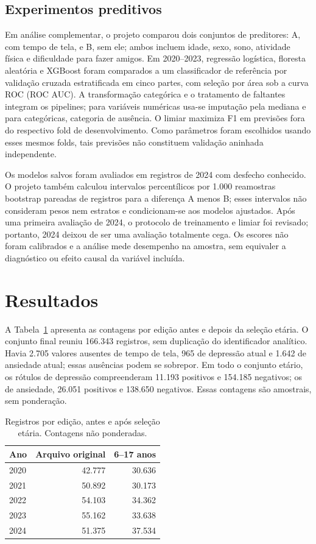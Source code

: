 ﻿\documentclass[12pt]{article}
\begin{document}
\subsection{Experimentos preditivos}
Em análise complementar, o projeto comparou dois conjuntos de preditores: A, com tempo de tela, e B, sem ele; ambos incluem idade, sexo, sono, atividade física e dificuldade para fazer amigos. Em 2020--2023, regressão logística, floresta aleatória e XGBoost foram comparados a um classificador de referência por validação cruzada estratificada em cinco partes, com seleção por área sob a curva ROC (ROC AUC). A transformação categórica e o tratamento de faltantes integram os pipelines; para variáveis numéricas usa-se imputação pela mediana e para categóricas, categoria de ausência. O limiar maximiza F1 em previsões fora do respectivo fold de desenvolvimento. Como parâmetros foram escolhidos usando esses mesmos folds, tais previsões não constituem validação aninhada independente.

Os modelos salvos foram avaliados em registros de 2024 com desfecho conhecido. O projeto também calculou intervalos percentílicos por 1.000 reamostras bootstrap pareadas de registros para a diferença A menos B; esses intervalos não consideram pesos nem estratos e condicionam-se aos modelos ajustados. Após uma primeira avaliação de 2024, o protocolo de treinamento e limiar foi revisado; portanto, 2024 deixou de ser uma avaliação totalmente cega. Os escores não foram calibrados e a análise mede desempenho na amostra, sem equivaler a diagnóstico ou efeito causal da variável incluída.
\section{Resultados}
A Tabela~\ref{tab:fluxo} apresenta as contagens por edição antes e depois da seleção etária. O conjunto final reuniu 166.343 registros, sem duplicação do identificador analítico. Havia 2.705 valores ausentes de tempo de tela, 965 de depressão atual e 1.642 de ansiedade atual; essas ausências podem se sobrepor. Em todo o conjunto etário, os rótulos de depressão compreenderam 11.193 positivos e 154.185 negativos; os de ansiedade, 26.051 positivos e 138.650 negativos. Essas contagens são amostrais, sem ponderação.
\begin{table}[ht]
\centering
\caption{Registros por edição, antes e após seleção etária. Contagens não ponderadas.}
\label{tab:fluxo}
\begin{tabular}{lrr}\hline
Ano & Arquivo original & 6--17 anos \\\hline
2020 & 42.777 & 30.636 \\
2021 & 50.892 & 30.173 \\
2022 & 54.103 & 34.362 \\
2023 & 55.162 & 33.638 \\
2024 & 51.375 & 37.534 \\\hline
\end{tabular}
\end{table}
\end{document}
